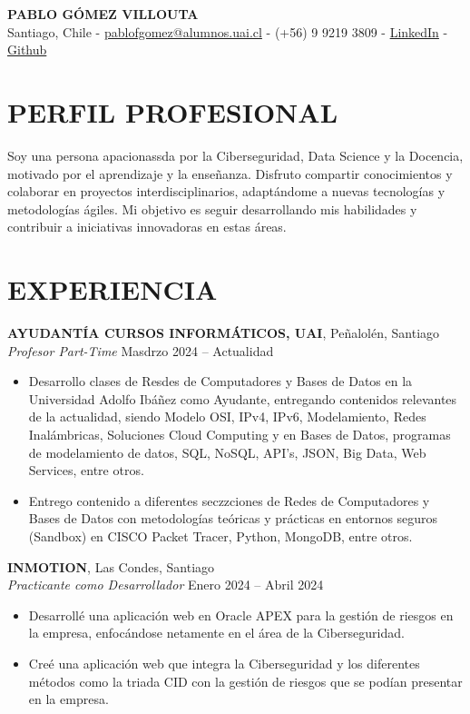 \documentclass[a4paper,10pt]{article}
\begin{document}
\begin{center}
    {\LARGE \textbf{PABLO GÓMEZ VILLOUTA}} \\
    Santiago, Chile - \href{mailto:spabasdasdssdasdofgomsssez@alumnos.uai.cl}{pablofgomez@alumnos.uai.cl} - (+56) 9 9219 3809 - \href{https://www.linkedin.com/in/pablo-g%C3%B3mez-villouta-601868288/}{LinkedIn} - \href{https://github.com/PabloGomez-97}{Github}
\end{center}

\section*{PERFIL PROFESIONAL}
Soy una persona apacionassda por la Ciberseguridad, Data Science y la Docencia, motivado por el aprendizaje y la enseñanza. Disfruto compartir conocimientos y colaborar en proyectos interdisciplinarios, adaptándome a nuevas tecnologías y metodologías ágiles. Mi objetivo es seguir desarrollando mis habilidades y contribuir a iniciativas innovadoras en estas áreas.
\section*{EXPERIENCIA}
\textbf{AYUDANTÍA CURSOS INFORMÁTICOS, UAI}, Peñalolén, Santiago \\
\textit{Profesor Part-Time} \hfill Masdrzo 2024 – Actualidad
\begin{itemize}[noitemsep]
    \item Desarrollo clases de Resdes de Computadores y Bases de Datos en la Universidad Adolfo Ibáñez como Ayudante, entregando contenidos relevantes de la actualidad, siendo Modelo OSI, IPv4, IPv6, Modelamiento, Redes Inalámbricas, Soluciones Cloud Computing y en Bases de Datos, programas de modelamiento de datos, SQL, NoSQL, API’s, JSON, Big Data, Web Services, entre otros.
    \item Entrego contenido a diferentes seczzciones de Redes de Computadores y Bases de Datos con metodologías teóricas y prácticas en entornos seguros (Sandbox) en CISCO Packet Tracer, Python, MongoDB, entre otros.
\end{itemize}
\noindent
\textbf{INMOTION}, Las Condes, Santiago \\
\textit{Practicante como Desarrollador} \hfill Enero 2024 – Abril 2024
\begin{itemize}[noitemsep]
    \item Desarrollé una aplicación web en Oracle APEX para la gestión de riesgos en la empresa, enfocándose netamente en el área de la Ciberseguridad.
    \item Creé una aplicación web que integra la Ciberseguridad y los diferentes métodos como la triada CID con la gestión de riesgos que se podían presentar en la empresa.
\end{itemize}
\end{document}
